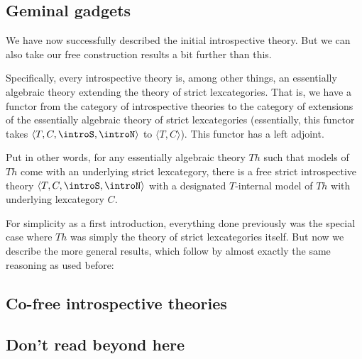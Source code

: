 \subsection{Geminal gadgets}
We have now successfully described the initial introspective theory. But we can also take our free construction results a bit further than this.

Specifically, every introspective theory is, among other things, an essentially algebraic theory extending the theory of strict lexcategories. That is, we have a functor from the category of introspective theories to the category of extensions of the essentially algebraic theory of strict lexcategories (essentially, this functor takes $\langle T, C, \introS, \introN \rangle$ to $\langle T, C \rangle$). This functor has a left adjoint.

Put in other words, for any essentially algebraic theory $Th$ such that models of $Th$ come with an underlying strict lexcategory, there is a free strict introspective theory $\langle T, C, \introS, \introN \rangle$ with a designated $T$-internal model of $Th$ with underlying lexcategory $C$.

For simplicity as a first introduction, everything done previously was the special case where $Th$ was simply the theory of strict lexcategories itself. But now we describe the more general results, which follow by almost exactly the same reasoning as used before:


\subsection{Co-free introspective theories}
\TODO

\subsection{Don't read beyond here}

